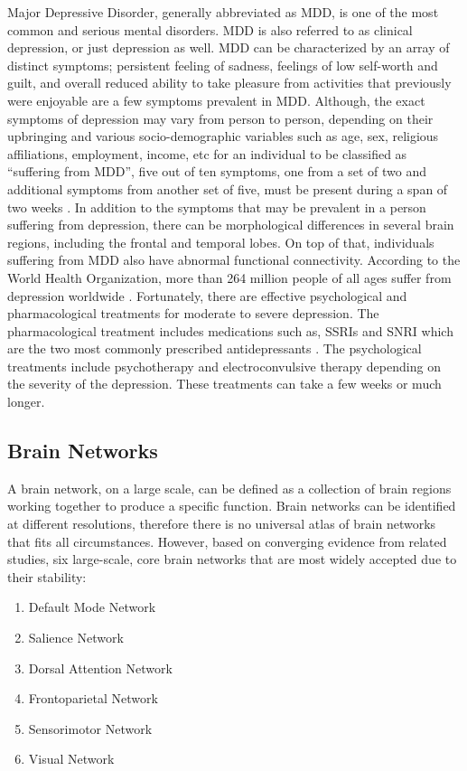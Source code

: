 \documentclass{article}
\begin{document}
Major Depressive Disorder, generally abbreviated as MDD, is one of the
most common and serious mental disorders. MDD is also referred to as
clinical depression, or just depression as well. MDD can be
characterized by an array of distinct symptoms; persistent feeling of
sadness, feelings of low self-worth and guilt, and overall reduced
ability to take pleasure from activities that previously were
enjoyable are a few symptoms prevalent in MDD. Although, the exact
symptoms of depression may vary from person to person, depending on
their upbringing and various socio-demographic variables such as age,
sex, religious affiliations, employment, income, etc for an individual
to be classified as “suffering from MDD”, five out of ten symptoms,
one from a set of two and additional symptoms from another set of
five, must be present during a span of two weeks \cite{whodepression}.
In addition to the symptoms that may be prevalent in a person
suffering from depression, there can be morphological differences in
several brain regions, including the frontal and temporal lobes. On
top of that, individuals suffering from MDD also have abnormal
functional connectivity. According to the World Health Organization,
more than 264 million people of all ages suffer from depression
worldwide \cite{whodepression}. Fortunately, there are effective
psychological and pharmacological treatments for moderate to severe
depression. The pharmacological treatment includes medications such
as, SSRIs and SNRI which are the two most commonly prescribed
antidepressants \cite{resting}. The psychological treatments include
psychotherapy and electroconvulsive therapy depending on the severity
of the depression. These treatments can take a few weeks or much
longer.

\subsection{Brain Networks}

A brain network, on a large scale, can be defined as a collection of
brain regions working together to produce a specific function. Brain
networks can be identified at different resolutions, therefore there
is no universal atlas of brain networks that fits all circumstances.
However, based on converging evidence from related studies, six
large-scale, core brain networks that are most widely accepted due to
their stability:

\begin{enumerate}[nosep]
  \item Default Mode Network
  \item Salience Network
  \item Dorsal Attention Network
  \item Frontoparietal Network
  \item Sensorimotor Network
  \item Visual Network
\end{enumerate}
\end{document}
